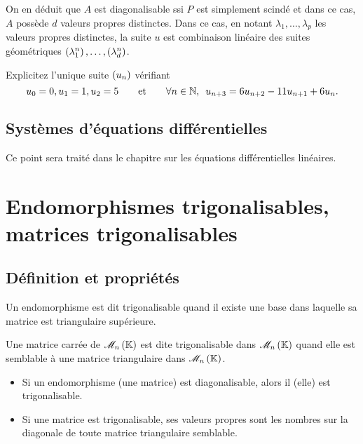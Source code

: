 On en déduit que \(A\) est diagonalisable ssi \(P\) est simplement scindé et dans ce cas, \(A\) possède \(d\) valeurs propres distinctes. Dans ce cas, en notant \(\lambda_1,\dots,\lambda_p\) les valeurs propres distinctes, la suite \(u\) est combinaison linéaire des suites géométriques \(\left(\lambda_1^n\right),\dots,\left(\lambda_d^n\right)\).

\begin{exo}
Explicitez l'unique suite \(\left(u_n\right)\) vérifiant \[u_0=0,u_1=1,u_2=5\qquad\text{et}\qquad\quantifs{\forall n\in\N}u_{n+3}=6u_{n+2}-11u_{n+1}+6u_n.\]
\end{exo}

\subsection{Systèmes d'équations différentielles}

Ce point sera traité dans le chapitre sur les équations différentielles linéaires.

\section{Endomorphismes trigonalisables, matrices trigonalisables}

\subsection{Définition et propriétés}

\begin{defi}
Un endomorphisme est dit trigonalisable quand il existe une base dans laquelle sa matrice est triangulaire supérieure.

Une matrice carrée de \(\M{n}\) est dite trigonalisable dans \(\M{n}\) quand elle est semblable à une matrice triangulaire dans \(\M{n}\).
\end{defi}

\begin{rem}
\begin{itemize}
    \item Si un endomorphisme (une matrice) est diagonalisable, alors il (elle) est trigonalisable. \\
    \item Si une matrice est trigonalisable, ses valeurs propres sont les nombres sur la diagonale de toute matrice triangulaire semblable.
\end{itemize}
\end{rem}

